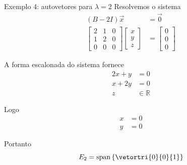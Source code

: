 \begin{frame}{Exemplo 4: autovetores para $\lambda=2$}
    Resolvemos o sistema
    \begin{align*}
        (B-2I)\vec{x}&=\vec{0}\\
        \begin{bmatrix}
            2 & 1 & 0\\
            1 & 2 & 0\\
            0 & 0 & 0
        \end{bmatrix}
        \begin{bmatrix}
            x\\y\\z
        \end{bmatrix}
        &=
        \begin{bmatrix}
            0\\0\\0
        \end{bmatrix}
    \end{align*}

    A forma escalonada do sistema fornece
    \begin{align*}
        2x+y&=0\\
        x+2y&=0\\
        z&\in\mathbb{R}
    \end{align*}

    Logo
    \begin{align*}
        x&=0\\
        y&=0
    \end{align*}

    Portanto
    \[
        E_{2}=
        \operatorname{span}
        \left\{\vetortri{0}{0}{1}\right\}
    \]
\end{frame}

